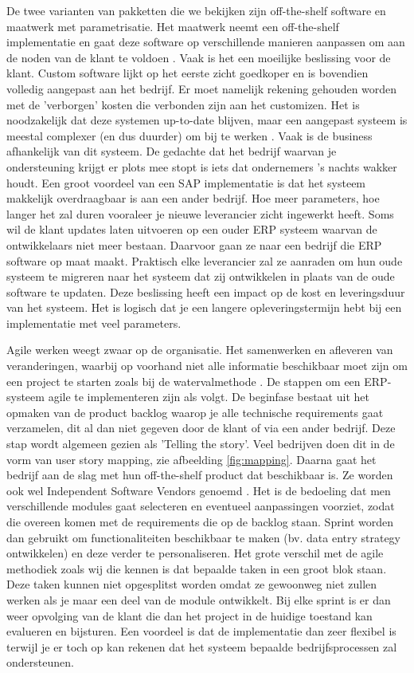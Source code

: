 De twee varianten van pakketten die we bekijken zijn off-the-shelf software en maatwerk met parametrisatie. Het maatwerk neemt een off-the-shelf implementatie en gaat deze software op verschillende manieren aanpassen om aan de noden van de klant te voldoen \autocite{Vollmer2016}. Vaak is het een moeilijke beslissing voor de klant. Custom software lijkt op het eerste zicht goedkoper en is bovendien volledig aangepast aan het bedrijf. Er moet namelijk rekening gehouden worden met de 'verborgen' kosten die verbonden zijn aan het customizen. Het is noodzakelijk dat deze systemen up-to-date blijven, maar een aangepast systeem is meestal complexer (en dus duurder) om bij te werken \autocite{Bdc2019}. Vaak is de business afhankelijk van dit systeem. De gedachte dat het bedrijf waarvan je ondersteuning krijgt er plots mee stopt is iets dat ondernemers 's nachts wakker houdt. Een groot voordeel van een SAP implementatie is dat het systeem makkelijk overdraagbaar is aan een ander bedrijf. Hoe meer parameters, hoe langer het zal duren vooraleer je nieuwe leverancier zicht ingewerkt heeft. Soms wil de klant updates laten uitvoeren op een ouder ERP systeem waarvan de ontwikkelaars niet meer bestaan. Daarvoor gaan ze naar een bedrijf die ERP software op maat maakt. Praktisch elke leverancier zal ze aanraden om hun oude systeem te migreren naar het systeem dat zij ontwikkelen in plaats van de oude software te updaten. Deze beslissing heeft een impact op de kost en leveringsduur van het systeem. Het is logisch dat je een langere opleveringstermijn hebt bij een implementatie met veel parameters.

Agile werken weegt zwaar op de organisatie. Het samenwerken en afleveren van veranderingen, waarbij op voorhand niet alle informatie beschikbaar moet zijn om een project te starten zoals bij de watervalmethode \autocite{Mrpeasy2018}. De stappen om een ERP-systeem agile te implementeren zijn als volgt. De beginfase bestaat uit het opmaken van de product backlog waarop je alle technische requirements gaat verzamelen, dit al dan niet gegeven door de klant of via een ander bedrijf. Deze stap wordt algemeen gezien als 'Telling the story'. Veel bedrijven doen dit in de vorm van user story mapping, zie afbeelding \ref{fig:mapping}. Daarna gaat het bedrijf aan de slag met hun off-the-shelf product dat beschikbaar is. Ze worden ook wel Independent Software Vendors genoemd \autocite{Mrpeasy2018}. Het is de bedoeling dat men verschillende modules gaat selecteren en eventueel aanpassingen voorziet, zodat die overeen komen met de requirements die op de backlog staan. Sprint worden dan gebruikt om functionaliteiten beschikbaar te maken (bv. data entry strategy ontwikkelen) en deze verder te personaliseren. Het grote verschil met de agile methodiek zoals wij die kennen is dat bepaalde taken in een groot blok staan. Deze taken kunnen niet opgesplitst worden omdat ze gewoonweg niet zullen werken als je maar een deel van de module ontwikkelt. Bij elke sprint is er dan weer opvolging van de klant die dan het project in de huidige toestand kan evalueren en bijsturen. Een voordeel is dat de implementatie dan zeer flexibel is terwijl je er toch op kan rekenen dat het systeem bepaalde bedrijfsprocessen zal ondersteunen.

